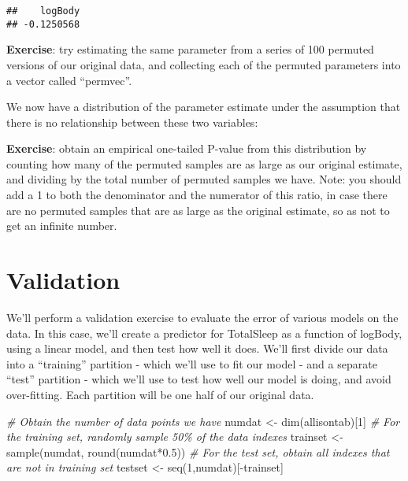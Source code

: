 \documentclass[
]{book}
\newenvironment{Shaded}{\begin{snugshade}}{\end{snugshade}}
\newcommand{\AttributeTok}[1]{\textcolor[rgb]{0.77,0.63,0.00}{#1}}
\newcommand{\CommentTok}[1]{\textcolor[rgb]{0.56,0.35,0.01}{\textit{#1}}}
\newcommand{\DecValTok}[1]{\textcolor[rgb]{0.00,0.00,0.81}{#1}}
\newcommand{\FloatTok}[1]{\textcolor[rgb]{0.00,0.00,0.81}{#1}}
\newcommand{\FunctionTok}[1]{\textcolor[rgb]{0.00,0.00,0.00}{#1}}
\newcommand{\NormalTok}[1]{#1}
\newcommand{\OtherTok}[1]{\textcolor[rgb]{0.56,0.35,0.01}{#1}}
\newcommand{\SpecialCharTok}[1]{\textcolor[rgb]{0.00,0.00,0.00}{#1}}
\begin{document}
\begin{Shaded}
\end{Shaded}

\begin{verbatim}
##    logBody 
## -0.1250568
\end{verbatim}

\textbf{Exercise}: try estimating the same parameter from a series of 100 permuted versions of our original data, and collecting each of the permuted parameters into a vector called ``permvec''.

We now have a distribution of the parameter estimate under the assumption that there is no relationship between these two variables:

\textbf{Exercise}: obtain an empirical one-tailed P-value from this distribution by counting how many of the permuted samples are as large as our original estimate, and dividing by the total number of permuted samples we have. Note: you should add a 1 to both the denominator and the numerator of this ratio, in case there are no permuted samples that are as large as the original estimate, so as not to get an infinite number.

\hypertarget{validation}{%
\section{Validation}\label{validation}}

We'll perform a validation exercise to evaluate the error of various models on the data. In this case, we'll create a predictor for TotalSleep as a function of logBody, using a linear model, and then test how well it does. We'll first divide our data into a ``training'' partition - which we'll use to fit our model - and a separate ``test'' partition - which we'll use to test how well our model is doing, and avoid over-fitting. Each partition will be one half of our original data.

\begin{Shaded}
\begin{Highlighting}[]
\CommentTok{\# Obtain the number of data points we have}
\NormalTok{numdat }\OtherTok{\textless{}{-}} \FunctionTok{dim}\NormalTok{(allisontab)[}\DecValTok{1}\NormalTok{]}
\CommentTok{\# For the training set, randomly sample 50\% of the data indexes}
\NormalTok{trainset }\OtherTok{\textless{}{-}} \FunctionTok{sample}\NormalTok{(numdat, }\FunctionTok{round}\NormalTok{(numdat}\SpecialCharTok{*}\FloatTok{0.5}\NormalTok{))}
\CommentTok{\# For the test set, obtain all indexes that are not in training set}
\NormalTok{testset }\OtherTok{\textless{}{-}} \FunctionTok{seq}\NormalTok{(}\DecValTok{1}\NormalTok{,numdat)[}\SpecialCharTok{{-}}\NormalTok{trainset]}
\end{Highlighting}
\end{Shaded}
\end{document}
